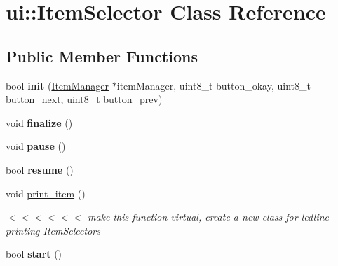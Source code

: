 \hypertarget{classui_1_1_item_selector}{}\section{ui\+::Item\+Selector Class Reference}
\label{classui_1_1_item_selector}
\subsection*{Public Member Functions}
\begin{DoxyCompactItemize}
\item 
\mbox{\label{classui_1_1_item_selector_a84e955a187898ac4773e06b3c342b1af}} 
bool {\bfseries init} (\mbox{\hyperlink{classui_1_1_item_manager}{Item\+Manager}} $\ast$item\+Manager, uint8\+\_\+t button\+\_\+okay, uint8\+\_\+t button\+\_\+next, uint8\+\_\+t button\+\_\+prev)
\item 
\mbox{\label{classui_1_1_item_selector_a0d7d05024fd34040d62fa7913acbb39b}} 
void {\bfseries finalize} ()
\item 
\mbox{\label{classui_1_1_item_selector_a4de79bd4c98d004c4b9b9bc115674e8f}} 
void {\bfseries pause} ()
\item 
\mbox{\label{classui_1_1_item_selector_a075b0338cb95c67b1fa6ba227439d5a0}} 
bool {\bfseries resume} ()
\item 
\mbox{\label{classui_1_1_item_selector_aecebefc5327f98a035b6aa9caabcf525}} 
void \mbox{\hyperlink{classui_1_1_item_selector_aecebefc5327f98a035b6aa9caabcf525}{print\+\_\+item}} ()
\begin{DoxyCompactList}\small\item\em $<$$<$$<$$<$$<$$<$ make this function virtual, create a new class for ledline-\/printing Item\+Selectors \end{DoxyCompactList}\item 
\mbox{\label{classui_1_1_item_selector_af0bf0ef3efc5cb46c0c350a35d41793b}} 
bool {\bfseries start} ()
\end{DoxyCompactItemize}
